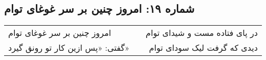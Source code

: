 \begin{center}
\section*{شماره ۱۹: امروز چنین بر سر غوغای توام}
\label{sec:019}
\begin{longtable}{l p{0.5cm} r}
امروز چنین بر سر غوغای توام
&&
در پای فتاده مست و شیدای توام
\\
گفتی: «پس ازین کار تو رونق گیرد»
&&
دیدی که گرفت لیک سودای توام
\\
\end{longtable}
\end{center}
